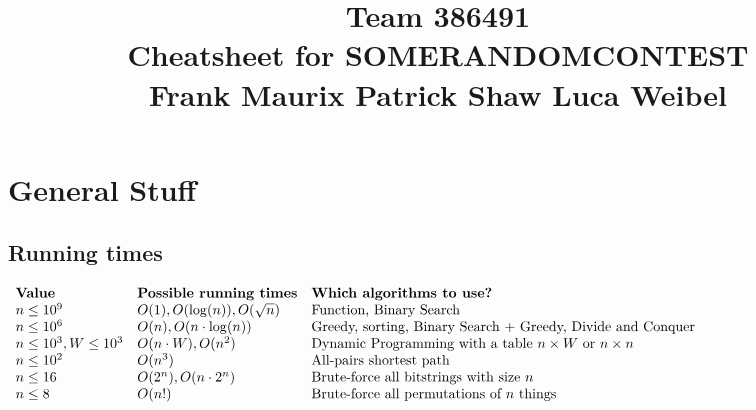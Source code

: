 \documentclass[a4paper,10pt]{article}
\title{\vspace{-1cm}\textmd{\textbf{Team 386491}}\\\vspace{5pt}\Large\textbf{{Cheatsheet for SOMERANDOMCONTEST}}\\\vspace{5pt}\large{Frank Maurix\hspace{1.5cm} Patrick Shaw\hspace{1.5cm} Luca Weibel}}
\author{}\date{}
\begin{document}
\maketitle
\vspace{-2.1cm}
\tableofcontents


\newpage\section{General Stuff}
\subsection{Running times}
$\begin{array}{lll}
\mbox{\textbf{Value}} & \mbox{\textbf{Possible running times}} & \mbox{\textbf{Which algorithms to use?}} \\
n \leq 10^9 & O(1), O(\log( n)), O(\sqrt{n}) & \mbox{Function, Binary Search} \\
n \leq 10^6 & O(n), O(n \cdot\log( n)) & \mbox{Greedy, sorting, Binary Search + Greedy, Divide and Conquer} \\
n \leq 10^3, W \leq 10^3 & O(n\cdot W), O(n^2) & \mbox{Dynamic Programming with a table $n \times W$ or $n\times n$} \\
n \leq 10^2 & O(n^3) & \mbox{All-pairs shortest path} \\
n \leq 16 & O(2^n), O(n \cdot2^n) & \mbox{Brute-force all bitstrings with size $n$}
 \\
n \leq 8 & O(n!) & \mbox{Brute-force all permutations of $n$ things} \\
\end{array}$
\end{document}
